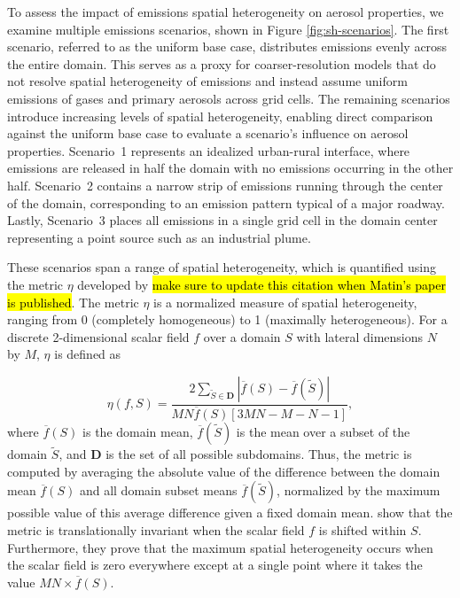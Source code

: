 \documentclass[journal abbreviation, manuscript]{copernicus}
\begin{document}
To assess the impact of emissions spatial heterogeneity on aerosol
properties, we examine multiple emissions scenarios, shown in Figure
\ref{fig:sh-scenarios}. The first scenario, referred to as the uniform
base case, distributes emissions evenly across the entire domain. This
serves as a proxy for coarser-resolution models that do not resolve
spatial heterogeneity of emissions and instead assume uniform
emissions of gases and primary aerosols across grid cells. The
remaining scenarios introduce increasing levels of spatial
heterogeneity, enabling direct comparison against the uniform base
case to evaluate a scenario's influence on aerosol properties. Scenario~1
represents an idealized urban-rural interface, where emissions are
released in half the domain with no emissions occurring in the other
half. Scenario~2 contains a narrow strip of emissions running through
the center of the domain, corresponding to an emission pattern typical
of a major roadway. Lastly, Scenario~3 places all emissions in a
single grid cell in the domain center representing a point source such
as an industrial plume.

These scenarios span a range of spatial heterogeneity, which is
quantified using the metric $\eta$ developed by
\citep{mohebalhojeh_2024} \hl{make sure to update this citation when
  Matin's paper is published}. The metric $\eta$ is a normalized
measure of spatial heterogeneity, ranging from 0 (completely
homogeneous) to 1 (maximally heterogeneous). For a discrete
2-dimensional scalar field $f$ over a domain $S$ with lateral
dimensions $N$ by $M$, $\eta$ is defined as

\begin{equation}
\eta(f, S) = \frac{2\sum_{\tilde{S}\in \mathbf{D}}|\overline{f}(S) - \overline{f}(\tilde{S})|}{MN\overline{f}(S)\left[3MN-M-N-1\right]}, 
\end{equation}
where $\overline{f}(S)$ is the domain mean, $\overline{f}(\tilde{S})$ is the mean over a subset of the domain
$\tilde{S}$, and $\mathbf{D}$ is the set of all possible subdomains. Thus, the metric is computed by averaging the absolute
value of the difference between the domain mean $\overline{f}(S)$ and
all domain subset means $\overline{f}(\tilde{S})$, normalized by the
maximum possible value of this average difference given a fixed domain mean. \citet{mohebalhojeh_2024} show that the metric is
translationally invariant when the scalar field $f$ is shifted within
$S$. Furthermore, they prove that the
maximum spatial heterogeneity occurs when the
scalar field is zero everywhere except at a single point
where it takes the value $MN\times\overline{f}(S)$.
\end{document}
